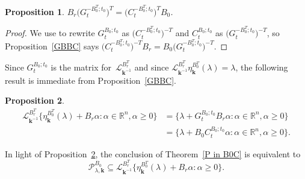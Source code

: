 \documentclass{amsart}
\newtheorem{proposition}{Proposition}[section]
\theoremstyle{definition}
\theoremstyle{remark}
\numberwithin{equation}{section}
\newcommand{\reals}{\mathbb R}
\newcommand{\sett}[1]{{\bigl\lbrace #1 \bigr\rbrace}}
\newcommand{\0}{{\mathbf{0}}}
\newcommand{\kk}{{\boldsymbol{k}}}
\renewcommand{\L}{\mathcal{L}}
\renewcommand{\P}{\mathcal{P}}
\begin{document}
\begin{proposition}\label{BGCB}
$B_r\bigl(G_t^{-B_0^T;t_0}\bigr)^T=\bigl(C_t^{-B_0^T;t_0}\bigr)^TB_0$.
\end{proposition}
\begin{proof}
We use \cite[Theorem~1.2]{NZ} to rewrite $G_t^{B_0;t_0}$ as $\bigl(C_t^{-B_0^T;t_0}\bigr)^{-T}$ and $C_t^{B_0;t_0}$ as $\bigl(G_t^{-B_0^T;t_0}\bigr)^{-T}$, so Proposition~\ref{GBBC} says $\bigl(C_t^{-B_0^T;t_0}\bigr)^{-T}B_r=B_0\bigl(G_t^{-B_0^T;t_0}\bigr)^{-T}$.
\end{proof}

Since $G_t^{B_0;t_0}$ is the matrix for~$\L_{\kk^{-1}}^{B_r^T}$ and since $\L_{\kk^{-1}}^{B_r^T}\eta_\kk^{B_0^T}(\lambda)=\lambda$, the following result is immediate from Proposition~\ref{GBBC}.

\begin{proposition}\label{B0C}
\begin{align*}
\L_{\kk^{-1}}^{B_r^T}\sett{\eta_\kk^{B_0^T}(\lambda)+B_r\alpha:\alpha\in\reals^n,\alpha\ge0}
&=\sett{\lambda+G_t^{B_0;t_0}B_r\alpha:\alpha\in\reals^n,\alpha\ge0}\\
&=\sett{\lambda+B_0C_t^{B_0;t_0}\alpha:\alpha\in\reals^n,\alpha\ge0}.
\end{align*}
\end{proposition}

In light of Proposition~\ref{B0C}, the conclusion of Theorem~\ref{P in B0C} is equivalent to
\[\P^{B_0}_{\lambda,\kk}\subseteq\L_{\kk^{-1}}^{B_r^T}\sett{\eta_\kk^{B_0^T}(\lambda)+B_r\alpha:\alpha\ge0}.\]
\end{document}
